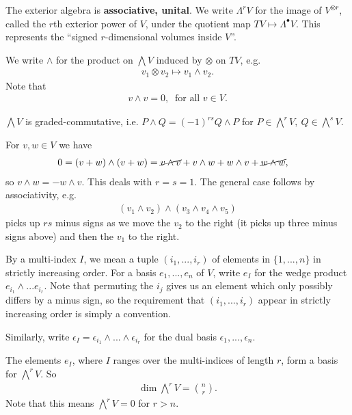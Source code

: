 The exterior algebra is \textbf{associative, unital}. We write $\Lambda^r V$ for the image of $V^{\otimes r}$, called the $r$th exterior power of $V$, under the quotient map $TV \mapsto \Lambda^\bullet V$. This represents the ``signed $r$-dimensional volumes inside $V$''.

We write $\wedge$ for the product on $\bigwedge V$ induced by $\otimes$ on $TV$, e.g.
\begin{align*}
	v_1\otimes v_2 \mapsto v_1\wedge v_2.
\end{align*}
Note that 
\begin{align*}
	v \wedge v = 0, ~ \text{ for all } v \in V.
\end{align*}

\begin{lem}\label{lem:lec2.37}
	$\bigwedge V$ is graded-commutative, i.e. $P\wedge Q = (-1)^{rs}Q\wedge P$ for $P \in \bigwedge^r V,~ Q \in \bigwedge^s V$.
\end{lem}
\begin{prf}
	For $v,w\in V$ we have
	\begin{align*}
		0 
		&= (v + w) \wedge (v + w) = \cancel{v\wedge v} + v\wedge w + w\wedge v + \cancel{w\wedge w},
	\end{align*}
	so $v\wedge w = -w\wedge v$. This deals with $r = s = 1$. The general case follows by associativity, e.g.
	\begin{align*}
		(v_1\wedge v_2) \wedge (v_3 \wedge v_4 \wedge v_5)
	\end{align*}
	picks up $rs$ minus signs as we move the $v_2$ to the right (it picks up three minus signs above) and then the $v_1$ to the right.
\end{prf}
\begin{defn}\label{defn:lec2.38}
	By a multi-index $I$, we mean a tuple $(i_1,...,i_r)$ of elements in $\{1,...,n\}$ in strictly increasing order. For a basis $e_1,...,e_n$ of $V$, write $e_I$ for the wedge product $e_{i_1}\wedge ... e_{i_r}$. Note that permuting the $i_j$ gives us an element which only possibly differs by a minus sign, so the requirement that $(i_1,...,i_r)$ appear in strictly increasing order is simply a convention.

	Similarly, write $\epsilon_I = \epsilon_{i_1}\wedge ... \wedge \epsilon_{i_r}$ for the dual basis $\epsilon_1,...,\epsilon_n$.
\end{defn}
\begin{lem}\label{lem:lec2.39}
	The elements $e_I$, where $I$ ranges over the multi-indices of length $r$, form a basis for $\bigwedge^r V$. So
	\begin{align*}
		\dim \bigwedge^r V = \binom{n}{r}.
	\end{align*}
	Note that this means $\bigwedge^r V = 0$ for $r > n$.
\end{lem}

